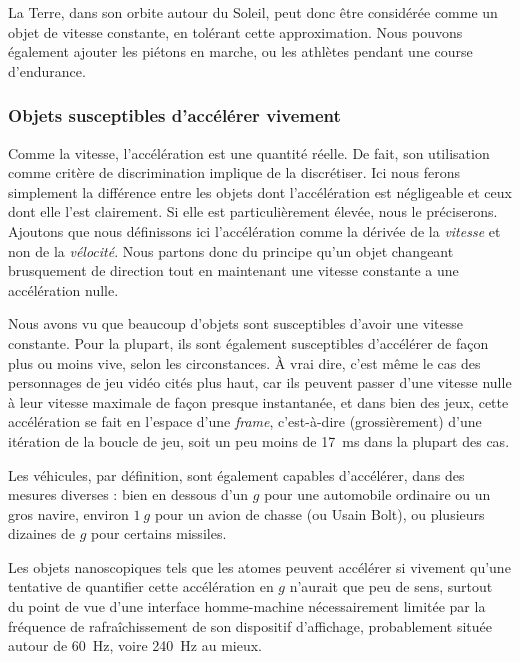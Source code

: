	La Terre, dans son orbite autour du Soleil, peut donc être considérée comme un objet de vitesse constante, en tolérant cette approximation. Nous pouvons également ajouter les piétons en marche, ou les athlètes pendant une course d'endurance.
	
	\subsubsection{Objets susceptibles d'accélérer vivement}
	Comme la vitesse, l'accélération est une quantité réelle. De fait, son utilisation comme critère de discrimination implique de la discrétiser. Ici nous ferons simplement la différence entre les objets dont l'accélération est négligeable et ceux dont elle l'est clairement. Si elle est particulièrement élevée, nous le préciserons. Ajoutons que nous définissons ici l'accélération comme la dérivée de la \emph{vitesse} et non de la \emph{vélocité}. Nous partons donc du principe qu'un objet changeant brusquement de direction tout en maintenant une vitesse constante a une \og accélération \fg{} nulle.
	
	Nous avons vu que beaucoup d'objets sont susceptibles d'avoir une vitesse constante. Pour la plupart, ils sont également susceptibles d'accélérer de façon plus ou moins vive, selon les circonstances. À vrai dire, c'est même le cas des personnages de jeu vidéo cités plus haut, car ils peuvent passer d'une vitesse nulle à leur vitesse maximale de façon presque instantanée, et dans bien des jeux, cette accélération se fait en l'espace d'une \emph{frame}, c'est-à-dire (grossièrement) d'une itération de la boucle de jeu, soit un peu moins de 17~ms dans la plupart des cas.
	
	Les véhicules, par définition, sont également capables d'accélérer, dans des mesures diverses : bien en dessous d'un $g$ pour une automobile ordinaire ou un gros navire, environ $1~g$ pour un avion de chasse (ou Usain Bolt\footnotemark{}), ou plusieurs dizaines de $g$ pour certains missiles\footnotemark{}.
	
	\addtocounter{footnote}{-1}
	\addtocounter{footnote}{1}
	
	Les objets nanoscopiques tels que les atomes peuvent accélérer si vivement qu'une tentative de quantifier cette accélération en $g$ n'aurait que peu de sens, surtout du point de vue d'une interface homme-machine nécessairement limitée par la fréquence de rafraîchissement de son dispositif d'affichage, probablement située autour de 60~Hz, voire 240~Hz au mieux\footnotemark{}.
	
